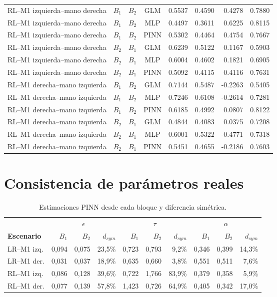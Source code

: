 \begin{landscape}
\begin{longtable}{p{4.2cm}cccrrrr}
RL--M1 izquierda--mano derecha & $B_1$ & $B_2$ & GLM & 0.5537 & 0.4590 & 0.4278 & 0.7880 \\
RL--M1 izquierda--mano derecha & $B_1$ & $B_2$ & MLP & 0.4497 & 0.3611 & 0.6225 & 0.8115 \\
RL--M1 izquierda--mano derecha & $B_1$ & $B_2$ & PINN & 0.5302 & 0.4464 & 0.4754 & 0.7667 \\
RL--M1 izquierda--mano derecha & $B_2$ & $B_1$ & GLM & 0.6239 & 0.5122 & 0.1167 & 0.5903 \\
RL--M1 izquierda--mano derecha & $B_2$ & $B_1$ & MLP & 0.6004 & 0.4602 & 0.1821 & 0.6905 \\
RL--M1 izquierda--mano derecha & $B_2$ & $B_1$ & PINN & 0.5092 & 0.4115 & 0.4116 & 0.7631 \\
RL--M1 derecha--mano izquierda & $B_1$ & $B_2$ & GLM & 0.7144 & 0.5487 & -0.2263 & 0.5405 \\
RL--M1 derecha--mano izquierda & $B_1$ & $B_2$ & MLP & 0.7246 & 0.6108 & -0.2614 & 0.7281 \\
RL--M1 derecha--mano izquierda & $B_1$ & $B_2$ & PINN & 0.6185 & 0.4992 & 0.0807 & 0.8122 \\
RL--M1 derecha--mano izquierda & $B_2$ & $B_1$ & GLM & 0.4844 & 0.4083 & 0.0375 & 0.7208 \\
RL--M1 derecha--mano izquierda & $B_2$ & $B_1$ & MLP & 0.6001 & 0.5322 & -0.4771 & 0.7318 \\
RL--M1 derecha--mano izquierda & $B_2$ & $B_1$ & PINN & 0.5451 & 0.4655 & -0.2186 & 0.7603 \\
\bottomrule
\end{longtable}
\end{landscape}

\section{Consistencia de parámetros reales}
\begin{table}[H]
\centering
\small
\caption{Estimaciones PINN desde cada bloque y diferencia simétrica.}
\begin{tabularx}{\textwidth}{Xrrrrrrrrr}
\toprule
& \multicolumn{3}{c}{$\epsilon$} & \multicolumn{3}{c}{$\tau$} & \multicolumn{3}{c}{$\alpha$}\\
\cmidrule(lr){2-4}\cmidrule(lr){5-7}\cmidrule(lr){8-10}
\textbf{Escenario} & $B_1$ & $B_2$ & $d_{sym}$ & $B_1$ & $B_2$ & $d_{sym}$ & $B_1$ & $B_2$ & $d_{sym}$ \\
\midrule
LR--M1 izq. & 0,094 & 0,075 & 23,5\% & 0,723 & 0,793 & 9,2\% & 0,346 & 0,399 & 14,3\%\\
LR--M1 der. & 0,031 & 0,037 & 18,9\% & 0,635 & 0,660 & 3,8\% & 0,551 & 0,511 & 7,6\%\\
RL--M1 izq. & 0,086 & 0,128 & 39,6\% & 0,722 & 1,766 & 83,9\% & 0,379 & 0,358 & 5,9\%\\
RL--M1 der. & 0,077 & 0,139 & 57,8\% & 1,423 & 0,726 & 64,9\% & 0,405 & 0,342 & 17,0\%\\
\bottomrule
\end{tabularx}
\end{table}

